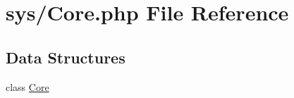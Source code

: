 \hypertarget{_core_8php}{}\section{sys/\+Core.php File Reference}
\label{_core_8php}
\subsection*{Data Structures}
\begin{DoxyCompactItemize}
\item 
class \hyperlink{class_core}{Core}
\end{DoxyCompactItemize}
